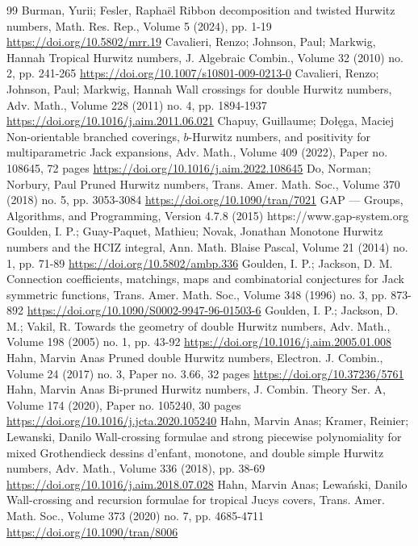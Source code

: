 \begin{thebibliography}{99}
 Burman, Yurii; Fesler, Raphaël Ribbon decomposition and twisted Hurwitz numbers, Math. Res. Rep., Volume 5 (2024), pp. 1-19 \url{https://doi.org/10.5802/mrr.19}
 Cavalieri, Renzo; Johnson, Paul; Markwig, Hannah Tropical Hurwitz numbers, J. Algebraic Combin., Volume 32 (2010) no. 2, pp. 241-265 \url{https://doi.org/10.1007/s10801-009-0213-0}
 Cavalieri, Renzo; Johnson, Paul; Markwig, Hannah Wall crossings for double Hurwitz numbers, Adv. Math., Volume 228 (2011) no. 4, pp. 1894-1937 \url{https://doi.org/10.1016/j.aim.2011.06.021}
 Chapuy, Guillaume; Dołęga, Maciej Non-orientable branched coverings, $b$-Hurwitz numbers, and positivity for multiparametric Jack expansions, Adv. Math., Volume 409 (2022), Paper no. 108645, 72 pages \url{https://doi.org/10.1016/j.aim.2022.108645}
 Do, Norman; Norbury, Paul Pruned Hurwitz numbers, Trans. Amer. Math. Soc., Volume 370 (2018) no. 5, pp. 3053-3084 \url{https://doi.org/10.1090/tran/7021}
 GAP — Groups, Algorithms, and Programming, Version 4.7.8 (2015) https://www.gap-system.org
 Goulden, I. P.; Guay-Paquet, Mathieu; Novak, Jonathan Monotone Hurwitz numbers and the HCIZ integral, Ann. Math. Blaise Pascal, Volume 21 (2014) no. 1, pp. 71-89 \url{https://doi.org/10.5802/ambp.336}
 Goulden, I. P.; Jackson, D. M. Connection coefficients, matchings, maps and combinatorial conjectures for Jack symmetric functions, Trans. Amer. Math. Soc., Volume 348 (1996) no. 3, pp. 873-892 \url{https://doi.org/10.1090/S0002-9947-96-01503-6}
 Goulden, I. P.; Jackson, D. M.; Vakil, R. Towards the geometry of double Hurwitz numbers, Adv. Math., Volume 198 (2005) no. 1, pp. 43-92 \url{https://doi.org/10.1016/j.aim.2005.01.008}
 Hahn, Marvin Anas Pruned double Hurwitz numbers, Electron. J. Combin., Volume 24 (2017) no. 3, Paper no. 3.66, 32 pages \url{https://doi.org/10.37236/5761}
 Hahn, Marvin Anas Bi-pruned Hurwitz numbers, J. Combin. Theory Ser. A, Volume 174 (2020), Paper no. 105240, 30 pages \url{https://doi.org/10.1016/j.jcta.2020.105240}
 Hahn, Marvin Anas; Kramer, Reinier; Lewanski, Danilo Wall-crossing formulae and strong piecewise polynomiality for mixed Grothendieck dessins d’enfant, monotone, and double simple Hurwitz numbers, Adv. Math., Volume 336 (2018), pp. 38-69 \url{https://doi.org/10.1016/j.aim.2018.07.028}
 Hahn, Marvin Anas; Lewański, Danilo Wall-crossing and recursion formulae for tropical Jucys covers, Trans. Amer. Math. Soc., Volume 373 (2020) no. 7, pp. 4685-4711 \url{https://doi.org/10.1090/tran/8006}

\end{thebibliography}
